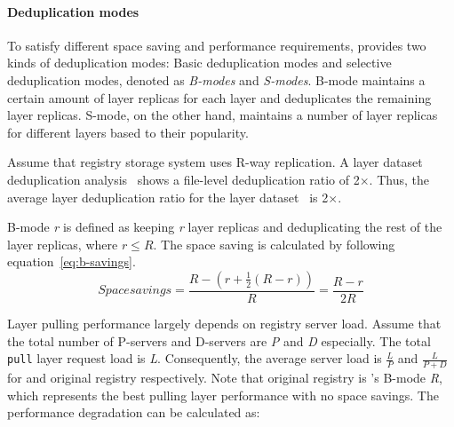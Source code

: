 \paragraph{Deduplication modes}
\label{sec:dedup-mode}

To satisfy different space saving and performance requirements,
\sysname provides two kinds of deduplication modes:
Basic deduplication modes and selective deduplication modes, denoted as \emph{B-modes} and \emph{S-modes}.
B-mode maintains a certain amount of layer replicas for each layer and deduplicates the remaining layer replicas.
S-mode, on the other hand, maintains a number of layer replicas for different layers 
based to their popularity.

Assume that registry storage system uses R-way replication.
A layer dataset deduplication analysis~\cite{xxx} shows a file-level deduplication ratio of 2$\times$.
Thus, the average layer deduplication ratio for the layer dataset~\cite{xxx} is 2$\times$.

B-mode \emph{r} is defined as keeping \emph{r} layer replicas and deduplicating the rest of the layer replicas, where $r \leq R$. 
The space saving is calculated by following equation~\ref{eq:b-savings}.
\begin{equation}\label{eq:b-savings}
Space savings = \frac{R-(r+\frac{1}{2}(R-r))}{R} = \frac{R-r}{2R}
\end{equation}


Layer pulling performance largely depends on registry server load.
Assume that the total number of P-servers and D-servers are \emph{P} and \emph{D} especially.
The total \texttt{pull} layer request load is \emph{L}.
Consequently, the average server load is $\frac{L}{P}$ and $\frac{L}{P+D}$ for \sysname and original registry respectively.
Note that original registry is \sysname's B-mode \emph{R}, which represents the best pulling layer performance with no space savings.
The performance degradation can be calculated as:
 
